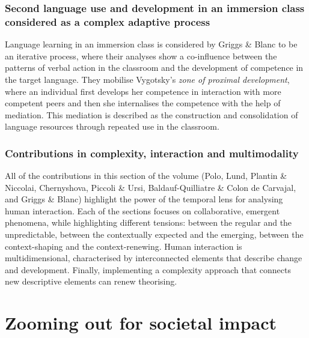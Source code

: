 \documentclass[output=paper]{langscibook}
\begin{document}
\subsubsection{Second language use and development in an immersion class considered as a complex adaptive process}

Language learning in an immersion class is considered by Griggs \& Blanc to be an iterative process, where their analyses show a co-influence between the patterns of verbal action in the classroom and the development of competence in the target language. They mobilise Vygotsky’s \textit{zone of proximal development}, where an individual first develops her competence in interaction with more competent peers and then she internalises the competence with the help of mediation. This mediation is described as the construction and consolidation of language resources through repeated use in the classroom.

\subsubsection{Contributions in complexity, interaction and multimodality}

All of the contributions in this section of the volume (Polo, Lund, Plantin \& Niccolai, Chernyshova, Piccoli \& Ursi, Baldauf-Quilliatre \& Colon de Carvajal, and Griggs \& Blanc) highlight the power of the temporal lens for analysing human interaction. Each of the sections focuses on collaborative, emergent phenomena, while highlighting different tensions: between the regular and the unpredictable, between the contextually expected and the emerging, between the context-shaping and the context-renewing. Human interaction is multidimensional, characterised by interconnected elements that describe change and development. Finally, implementing a complexity approach that connects new descriptive elements can renew theorising.

\section{Zooming out for societal impact}
\end{document}
